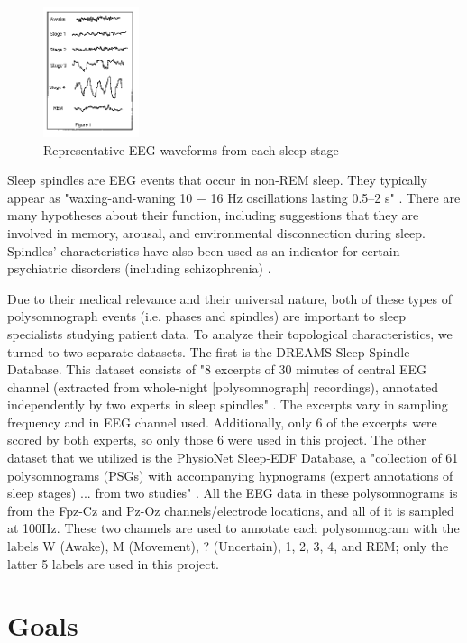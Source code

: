 \documentclass[11pt]{article}
\begin{document}
\begin{figure}[h]
    \centering
    \includegraphics[width=0.25\textwidth]{sleepeeg} 
    \caption{Representative EEG waveforms from each sleep stage \cite{ninds}}
    \label{fig:stageseeg}
\end{figure}

Sleep spindles are EEG events that occur in non-REM sleep. They typically appear as "waxing-and-waning 10 $-$ 16 Hz oscillations lasting 0.5–2 s" \cite{Andrillon17821}. There are many hypotheses about their function, including suggestions that they are involved in memory, arousal, and environmental disconnection during sleep. Spindles' characteristics have also been used as an indicator for certain psychiatric disorders (including schizophrenia) \cite{Andrillon17821}.

Due to their medical relevance and their universal nature, both of these types of polysomnograph events (i.e. phases and spindles) are important to sleep specialists studying patient data. To analyze their topological characteristics, we turned to two separate datasets. The first is the DREAMS Sleep Spindle Database. This dataset consists of "8 excerpts of 30 minutes of central EEG channel (extracted from whole-night [polysomnograph] recordings), annotated independently by two experts in sleep spindles" \cite{dreams}. The excerpts vary in sampling frequency and in EEG channel used. Additionally, only 6 of the excerpts were scored by both experts, so only those 6 were used in this project. The other dataset that we utilized is the PhysioNet Sleep-EDF Database, a "collection of 61 polysomnograms (PSGs) with accompanying hypnograms (expert annotations of sleep stages) ... from two studies" \cite{kemp2000analysis}. All the EEG data in these polysomnograms is from the Fpz-Cz and Pz-Oz channels/electrode locations, and all of it is sampled at 100Hz. These two channels are used to annotate each polysomnogram with the labels W (Awake), M (Movement), ? (Uncertain), 1, 2, 3, 4, and REM; only the latter 5 labels are used in this project. 

\section{Goals} 
\end{document}
